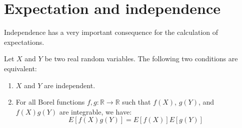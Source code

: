 \section{Expectation and independence}%
Independence has a very important consequence for the calculation of expectations.%
\begin{proposition}
Let $X$ and $Y$ be two real random variables. The following two conditions are equivalent:
\begin{enumerate}
    \item[i)] $X$ and $Y$ are independent.
    \item[ii)] For all Borel functions $f, g: \mathbb{R} \to \mathbb{R}$ such that $f(X)$, $g(Y)$, and $f(X)g(Y)$ are integrable, we have:
    \[ E[f(X)g(Y)] = E[f(X)]E[g(Y)] \]
\end{enumerate}
\end{proposition}%
